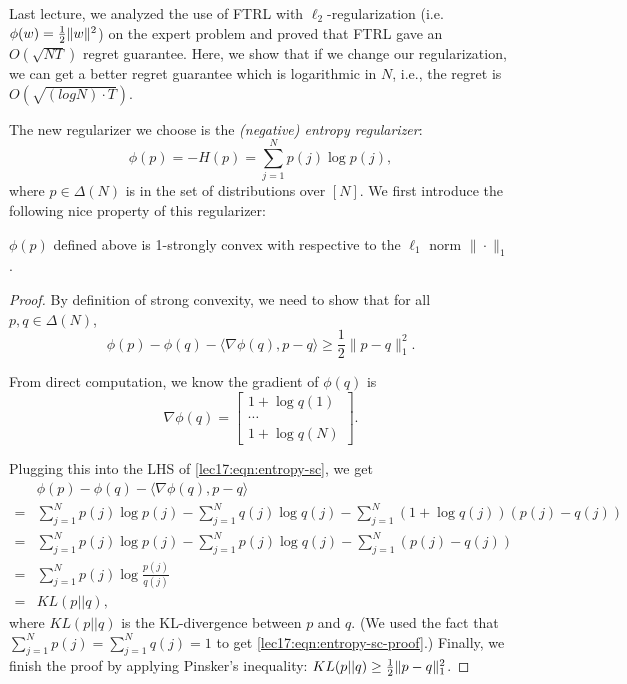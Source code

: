 
Last lecture, we analyzed the use of FTRL with $\ell_2$-regularization (i.e. $\phi(w) = \frac{1}{2}\|w\|^2$) on the expert problem and proved that FTRL gave an $O(\sqrt{NT})$ regret guarantee. Here, we show that if we change our regularization, we can get a better regret guarantee which is logarithmic in $N$, i.e., the regret is $O(\sqrt{(log N) \cdot T})$.

The new regularizer we choose is the \textit{(negative) entropy regularizer}:
\begin{equation}
\phi(p) = -H(p) = \sum_{j=1}^N p(j)\log p(j),
\end{equation}
where $p \in \Delta(N)$ is in the set of distributions over $[N]$. We first introduce the following nice property of this regularizer:
\begin{lemma}
	$\phi(p)$ defined above is 1-strongly convex with respective to the $\ell_1$ norm $\|\cdot\|_1$. 
\end{lemma}

\begin{proof}
By definition of strong convexity, we need to show that for all $p, q \in \Delta(N)$,
\begin{equation}\label{lec17:eqn:entropy-sc}
\phi(p) - \phi(q) - \langle \nabla \phi(q), p-q\rangle \geq \frac{1}{2} \|p-q\|_1^2.
\end{equation}
	
From direct computation, we know the gradient of $\phi(q)$ is 
\begin{equation}
\nabla\phi(q) = \begin{bmatrix} 1+\log q(1)\\\cdots \\ 1+\log q(N) \end{bmatrix}.
\end{equation}
	
Plugging this into the LHS of \eqref{lec17:eqn:entropy-sc}, we get
\begin{align}
&\phi(p) - \phi(q) - \langle \nabla \phi(q), p-q\rangle  \\
=& \sum_{j=1}^N p(j)\log p(j) - \sum_{j=1}^N q(j)\log q(j) - \sum_{j=1}^N \left(1 + \log q(j)\right)\left(p(j) - q(j)\right) \\
=& \sum_{j=1}^N p(j)\log p(j) - \sum_{j=1}^N p(j)\log q(j) - \sum_{j=1}^N \left(p(j) - q(j)\right)\\
=& \sum_{j=1}^N p(j) \log \frac{p(j)}{q(j)} \label{lec17:eqn:entropy-sc-proof} \\
=& KL(p||q),
\end{align}
where $KL(p || q)$ is the KL-divergence between $p$ and $q$. (We used the fact that $\sum_{j=1}^N p(j) = \sum_{j=1}^N q(j) = 1$ to get \eqref{lec17:eqn:entropy-sc-proof}.) Finally, we finish the proof by applying Pinsker's inequality: $KL(p||q) \geq \frac{1}{2} \|p-q\|_1^2$. 
	
\end{proof}

